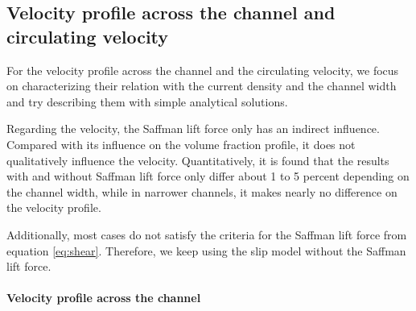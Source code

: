 \subsection{Velocity profile across the channel and circulating velocity}

For the velocity profile across the channel and the circulating velocity, we focus on characterizing their relation with the current density and the channel width and try describing them with simple analytical solutions. 


Regarding the velocity, the Saffman lift force only has an indirect influence. Compared with its influence on the volume fraction profile, it does not qualitatively influence the velocity.
Quantitatively, it is found that the results with and without Saffman lift force only differ about 1 to 5 percent depending on the channel width, while in narrower channels, it makes nearly no difference on the velocity profile. 

Additionally, most cases do not satisfy the criteria for the Saffman lift force from equation \ref{eq:shear}. Therefore, we keep using the slip model without the Saffman lift force.




\paragraph{Velocity profile across the channel}
\*

